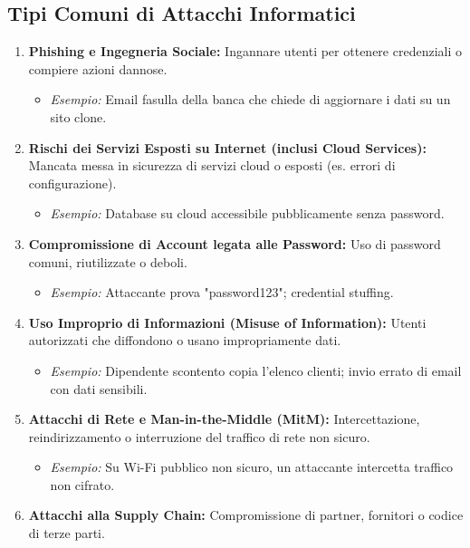 \subsection{Tipi Comuni di Attacchi Informatici}
\begin{enumerate}
    \item \textbf{Phishing e Ingegneria Sociale:} Ingannare utenti per ottenere credenziali o compiere azioni dannose.
        \begin{itemize}
            \item \textit{Esempio:} Email fasulla della banca che chiede di aggiornare i dati su un sito clone.
        \end{itemize}
    \item \textbf{Rischi dei Servizi Esposti su Internet (inclusi Cloud Services):} Mancata messa in sicurezza di servizi cloud o esposti (es. errori di configurazione).
        \begin{itemize}
            \item \textit{Esempio:} Database su cloud accessibile pubblicamente senza password.
        \end{itemize}
    \item \textbf{Compromissione di Account legata alle Password:} Uso di password comuni, riutilizzate o deboli.
        \begin{itemize}
            \item \textit{Esempio:} Attaccante prova "password123"; credential stuffing.
        \end{itemize}
    \item \textbf{Uso Improprio di Informazioni (Misuse of Information):} Utenti autorizzati che diffondono o usano impropriamente dati.
        \begin{itemize}
            \item \textit{Esempio:} Dipendente scontento copia l'elenco clienti; invio errato di email con dati sensibili.
        \end{itemize}
    \item \textbf{Attacchi di Rete e Man-in-the-Middle (MitM):} Intercettazione, reindirizzamento o interruzione del traffico di rete non sicuro.
        \begin{itemize}
            \item \textit{Esempio:} Su Wi-Fi pubblico non sicuro, un attaccante intercetta traffico non cifrato.
        \end{itemize}
    \item \textbf{Attacchi alla Supply Chain:} Compromissione di partner, fornitori o codice di terze parti.

\end{enumerate}
